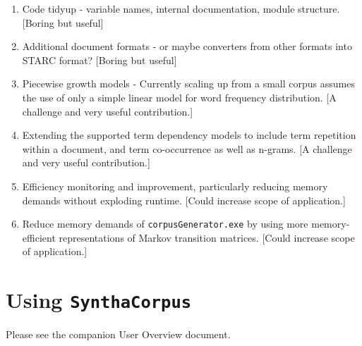 \documentclass{article}
\newcommand{\projectName}{\texttt{SynthaCorpus}}
\begin{document}
\begin{enumerate}
  \item Code tidyup - variable names, internal documentation, module
    structure.  [Boring but useful]
    \item Additional document formats - or maybe converters from other
      formats into STARC format?  [Boring but useful]
      \item Piecewise growth models - Currently scaling up from a
        small corpus assumes the use of only a simple linear model for
        word frequency distribution.  [A challenge and very useful
          contribution.]
        \item Extending the supported term dependency models to include
          term repetition within a document, and term co-occurrence as
          well as n-grams. [A challenge and very useful
          contribution.]
        \item Efficiency monitoring and improvement, particularly
          reducing memory demands without exploding runtime.  [Could
            increase scope of application.]
          \item Reduce memory demands of \verb|corpusGenerator.exe| by
            using more memory-efficient representations of Markov
            transition matrices.  [Could
            increase scope of application.]
        \end{enumerate}

\section{Using \projectName}

Please see the companion User Overview document.
\end{document}
